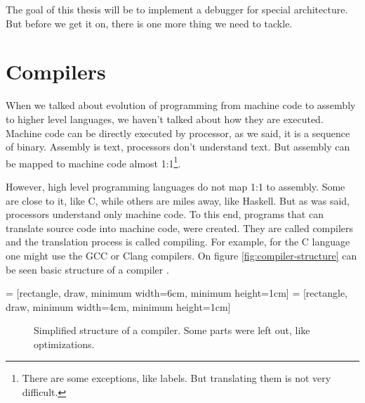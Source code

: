 The goal of this thesis will be to implement a debugger for special architecture. But before we get it on, there
is one more thing we need to tackle.

\section{Compilers}
When we talked about evolution of programming from machine code to assembly to higher level languages, we haven't
talked about how they are executed. Machine code can be directly executed by processor, as we said, it is a sequence
of binary. Assembly is text, processors don't understand text. But assembly can be mapped to machine code almost 
1:1\footnote{There are some exceptions, like labels. But translating them is not very difficult.}.

However, high level programming languages do not map 1:1 to assembly. Some are close to it, like C, while others
are miles away, like Haskell. But as was said, processors understand only machine code. To this end, programs that
can translate source code into machine code, were created. They are called compilers and the translation process is
called compiling. For example, for the C language one might use the GCC or Clang compilers.
On figure \ref{fig:compiler-structure} can be seen basic structure of a compiler \cite{dragon-book}. 

 = [rectangle, draw, minimum width=6cm, minimum height=1cm] 
 = [rectangle, draw, minimum width=4cm, minimum height=1cm] 
\begin{figure}\label{fig:compiler-structure}
    {\centering
    \par}
    \caption{Simplified structure of a compiler. Some parts were left out, like optimizations.}
    \label{fig:compiler_tikz}
\end{figure}

